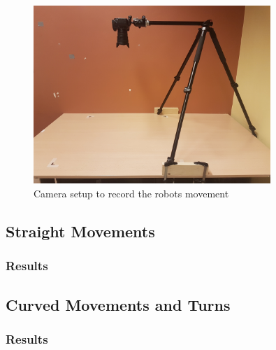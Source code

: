 \begin{figure}
	\centering
	\includegraphics[width=0.8\textwidth]{pics/movement_setup.jpg}
	\caption{Camera setup to record the robots movement}
	\label{fig:movement_setup}
\end{figure}

\begin{table}
	\centering
	\caption{Parameters changed in the experiment}
	\label{tab:movement_experiment}
\end{table}



\subsection{Straight Movements}


\subsubsection{Results}


\subsection{Curved Movements and Turns}


\subsubsection{Results}



